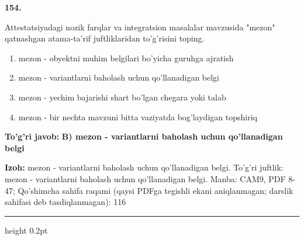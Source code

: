 \documentclass[10pt,a4paper]{article}
\begin{document}
{\bfseries\sffamily\color{ink} 154.}
\par
Attestatsiyadagi nozik farqlar va integratsion masalalar mavzusida "mezon" qatnashgan atama-ta'rif juftliklaridan to'g'risini toping.
\begin{enumerate}[label=\Alph*),leftmargin=9mm]
\item mezon - obyektni muhim belgilari bo'yicha guruhga ajratish
\item mezon - variantlarni baholash uchun qo'llanadigan belgi
\item mezon - yechim bajarishi shart bo'lgan chegara yoki talab
\item mezon - bir nechta mavzuni bitta vaziyatda bog'laydigan topshiriq
\end{enumerate}
\begin{tcolorbox}[enhanced,breakable,colback=teal!4,colframe=teal!60!black,boxrule=0.45pt,arc=1.2mm,left=2.7mm,right=2.7mm,top=1.8mm,bottom=1.8mm,before skip=2mm,after skip=2mm]
{\bfseries\sffamily\color{teal}To'g'ri javob:} \textbf{B) mezon - variantlarni baholash uchun qo'llanadigan belgi}
\par\smallskip
{\bfseries Izoh:} mezon - variantlarni baholash uchun qo'llanadigan belgi. To'g'ri juftlik: mezon - variantlarni baholash uchun qo'llanadigan belgi. Manba: CAM9, PDF 8-47; Qo'shimcha sahifa raqami (qaysi PDFga tegishli ekani aniqlanmagan; darslik sahifasi deb tasdiqlanmagan): 116
\end{tcolorbox}
\vspace{2mm}\hrule height 0.2pt\vspace{3mm}
\end{document}
